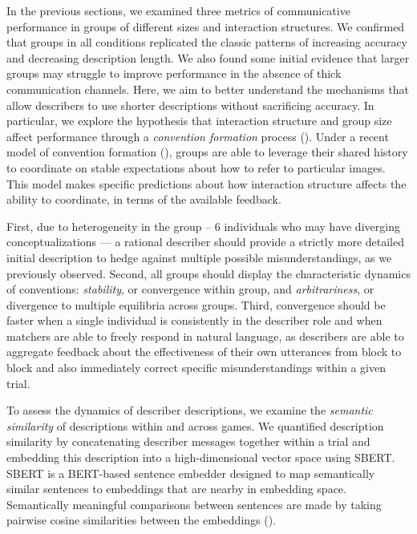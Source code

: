 \documentclass[
  english,
]{article}
\begin{document}
In the previous sections, we examined three metrics of communicative performance in groups of different sizes and interaction structures.
We confirmed that groups in all conditions replicated the classic patterns of increasing accuracy and decreasing description length.
We also found some initial evidence that larger groups may struggle to improve performance in the absence of thick communication channels.
Here, we aim to better understand the mechanisms that allow describers to use shorter descriptions without sacrificing accuracy.
In particular, we explore the hypothesis that interaction structure and group size affect performance through a \emph{convention formation} process ().
Under a recent model of convention formation (), groups are able to leverage their shared history to coordinate on stable expectations about how to refer to particular images.
This model makes specific predictions about how interaction structure affects the ability to coordinate, in terms of the available feedback.

First, due to heterogeneity in the group -- 6 individuals who may have diverging conceptualizations --- a rational describer should provide a strictly more detailed initial description to hedge against multiple possible misunderstandings, as we previously observed.
Second, all groups should display the characteristic dynamics of conventions: \emph{stability}, or convergence within group, and \emph{arbitrariness}, or divergence to multiple equilibria across groups.
Third, convergence should be faster when a single individual is consistently in the describer role and when matchers are able to freely respond in natural language, as describers are able to aggregate feedback about the effectiveness of their own utterances from block to block and also immediately correct specific misunderstandings within a given trial.

To assess the dynamics of describer descriptions, we examine the \emph{semantic similarity} of descriptions within and across games.
We quantified description similarity by concatenating describer messages together within a trial and embedding this description into a high-dimensional vector space using SBERT.
SBERT is a BERT-based sentence embedder designed to map semantically similar sentences to embeddings that are nearby in embedding space.
Semantically meaningful comparisons between sentences are made by taking pairwise cosine similarities between the embeddings ().
\end{document}
